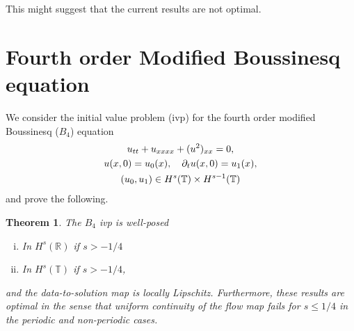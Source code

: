 \documentclass[12pt,reqno]{amsart}
\numberwithin{equation}{section}  %
\numberwithin{figure}{section}
\newcommand{\rr}{\mathbb{R}}
\newcommand{\ci}{\mathbb{T}}
\newcommand{\p}{\partial}
\theoremstyle{plain}
\newtheorem{theorem}{Theorem}
\theoremstyle{definition}
\theoremstyle{remark}
\begin{document}
This might suggest that the current results are not optimal.


%

%
%
%
%
%


%
\section{Fourth order Modified Boussinesq  equation}
%
We consider the initial value problem (ivp) for the fourth order modified Boussinesq
($B_4$) equation 
\begin{gather}
  u_{tt}   + u_{xxxx} + (u^2)_{xx} = 0,
  \label{eqn:mb-2}
  \\
  u(x,0) = u_{0}(x), \quad \p_t u(x, 0) = u_1(x), 
  \label{eqn:mb-init-data-2}
  \\
  \notag
  (u_0, u_1) \in
  H^{s}(\ci) \times
  H^{s-1}(\ci)  
\end{gather}
and prove the following.
%
%
%
%
%
%
%
%
\begin{theorem}
  The $B_{4}$ ivp is well-posed
  \begin{enumerate}[(i)]
    \item In $H^s(\rr)$ if $s > -1/4$
    \item In $H^{s}(\ci)$ if $s > -1/4$,
  \end{enumerate}
  and the data-to-solution map is locally Lipschitz. Furthermore, these results
  are optimal in the sense that uniform continuity of the flow map fails for $s
  \le 1/4$ in the periodic and non-periodic cases.
\label{thm:wp-2}
\end{theorem}
%

%
%
%
%
%
%
%
%



%
%
%
%
%
%
%
%
\end{document}
